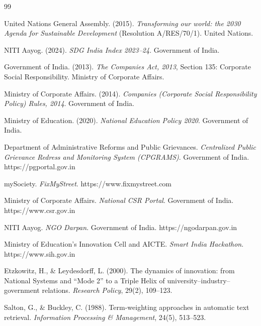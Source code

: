 \makeatletter
\renewcommand{\@biblabel}[1]{#1.}
\makeatother
\renewcommand{\bibname}{REFERENCES}
\cleardoublepage
{}
{}
\begin{thebibliography}{99}
\setlength{\itemsep}{3pt}

 United Nations General Assembly. (2015). \emph{Transforming our world: the 2030 Agenda for Sustainable Development} (Resolution A/RES/70/1). United Nations.

 NITI Aayog. (2024). \emph{SDG India Index 2023--24}. Government of India.

 Government of India. (2013). \emph{The Companies Act, 2013}, Section 135: Corporate Social Responsibility. Ministry of Corporate Affairs.

 Ministry of Corporate Affairs. (2014). \emph{Companies (Corporate Social Responsibility Policy) Rules, 2014}. Government of India.

 Ministry of Education. (2020). \emph{National Education Policy 2020}. Government of India.

 Department of Administrative Reforms and Public Grievances. \emph{Centralized Public Grievance Redress and Monitoring System (CPGRAMS)}. Government of India. https://pgportal.gov.in

 mySociety. \emph{FixMyStreet}. https://www.fixmystreet.com

 Ministry of Corporate Affairs. \emph{National CSR Portal}. Government of India. https://www.csr.gov.in

 NITI Aayog. \emph{NGO Darpan}. Government of India. https://ngodarpan.gov.in

 Ministry of Education's Innovation Cell and AICTE. \emph{Smart India Hackathon}. https://www.sih.gov.in

 Etzkowitz, H., \& Leydesdorff, L. (2000). The dynamics of innovation: from National Systems and ``Mode 2'' to a Triple Helix of university--industry--government relations. \emph{Research Policy}, 29(2), 109--123.

 Salton, G., \& Buckley, C. (1988). Term-weighting approaches in automatic text retrieval. \emph{Information Processing \& Management}, 24(5), 513--523.


\end{thebibliography}
